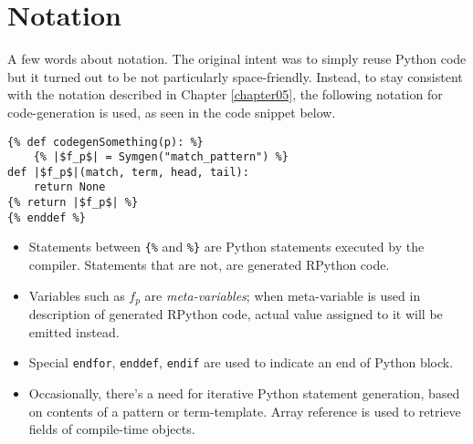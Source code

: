 \section{Notation}

A few words about notation. The original intent was to simply reuse Python code but it turned out to be not particularly space-friendly. Instead, to stay consistent with the notation described in Chapter \ref{chapter05}, the following notation for code-generation is used, as seen in the code snippet below.


\begin{verbatim}
{% def codegenSomething(p): %}
	{% |$f_p$| = Symgen("match_pattern") %}
def |$f_p$|(match, term, head, tail):
	return None
{% return |$f_p$| %}
{% enddef %}
\end{verbatim}

\begin{itemize}
\item Statements between \texttt{\{\%} and \texttt{\%\}} are Python statements executed by the compiler. Statements that are not, are generated RPython code.
\item Variables such as $f_p$ are \textit{meta-variables}; when meta-variable is used in description of generated RPython code, actual value assigned to it will be emitted instead.
\item Special \texttt{endfor}, \texttt{enddef}, \texttt{endif} are used to indicate an end of Python block.
\item Occasionally, there's a need for iterative Python statement generation, based on contents of a pattern or term-template. Array reference is used to retrieve fields of compile-time objects.

\end{itemize}
